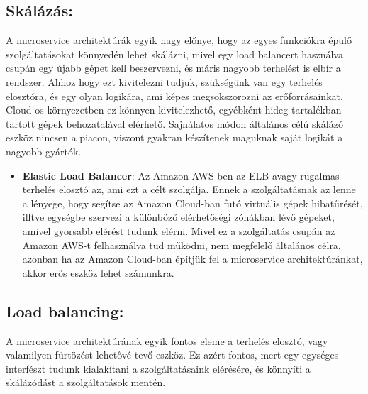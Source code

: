 \documentclass[11pt,magyar,a4paper,oneside,]{report}
\providecommand{\tightlist}{%
  \setlength{\itemsep}{0pt}\setlength{\parskip}{0pt}}
\begin{document}
\subsection{Skálázás:}\label{skuxe1luxe1zuxe1s}

A microservice architektúrák egyik nagy előnye, hogy az egyes funkciókra
épülő szolgáltatásokat könnyedén lehet skálázni, mivel egy load
balancert használva csupán egy újabb gépet kell beszervezni, és máris
nagyobb terhelést is elbír a rendszer. Ahhoz hogy ezt kivitelezni
tudjuk, szükségünk van egy terhelés elosztóra, és egy olyan logikára,
ami képes megsokszorozni az erőforrásainkat. Cloud-os környezetben ez
könnyen kivitelezhető, egyébként hideg tartalékban tartott gépek
behozatalával elérhető. Sajnálatos módon általános célú skálázó eszköz
nincsen a piacon, viszont gyakran készítenek maguknak saját logikát a
nagyobb gyártók.

\begin{itemize}
\tightlist
\item
  \textbf{Elastic Load Balancer}: Az Amazon AWS-ben az ELB avagy
  rugalmas terhelés elosztó az, ami ezt a célt szolgálja. Ennek a
  szolgáltatásnak az lenne a lényege, hogy segítse az Amazon Cloud-ban
  futó virtuális gépek hibatűrését, illtve egységbe szervezi a különböző
  elérhetőségi zónákban lévő gépeket, amivel gyorsabb elérést tudunk
  elérni. Mivel ez a szolgáltatás csupán az Amazon AWS-t felhasználva
  tud működni, nem megfelelő általános célra, azonban ha az Amazon
  Cloud-ban építjük fel a microservice architektúránkat, akkor erős
  eszköz lehet számunkra.
\end{itemize}

\subsection{Load balancing:}\label{load-balancing}

A microservice architektúrának egyik fontos eleme a terhelés elosztó,
vagy valamilyen fürtözést lehetővé tevő eszköz. Ez azért fontos, mert
egy egységes interfészt tudunk kialakítani a szolgáltatásaink elérésére,
és könnyíti a skálázódást a szolgáltatások mentén.
\end{document}
